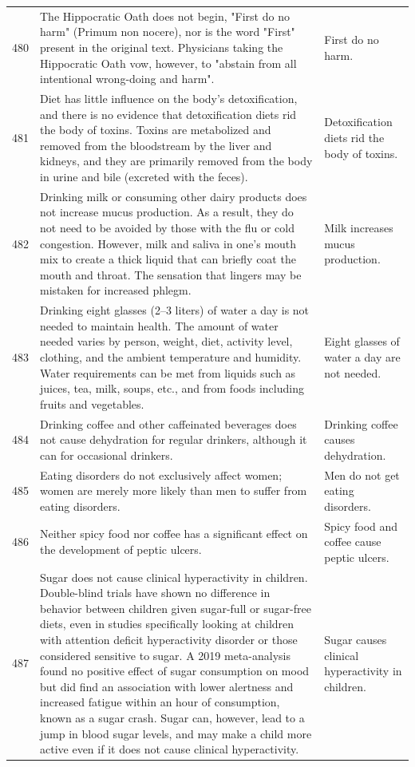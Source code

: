 \begin{tabular}{c|p{}|p{}}
480 & The Hippocratic Oath does not begin, "First do no harm" (Primum non nocere), nor is the word "First" present in the original text. Physicians taking the Hippocratic Oath vow, however, to "abstain from all intentional wrong-doing and harm". & First do no harm. \\
481 & Diet has little influence on the body's detoxification, and there is no evidence that detoxification diets rid the body of toxins. Toxins are metabolized and removed from the bloodstream by the liver and kidneys, and they are primarily removed from the body in urine and bile (excreted with the feces). & Detoxification diets rid the body of toxins. \\
482 & Drinking milk or consuming other dairy products does not increase mucus production. As a result, they do not need to be avoided by those with the flu or cold congestion. However, milk and saliva in one's mouth mix to create a thick liquid that can briefly coat the mouth and throat. The sensation that lingers may be mistaken for increased phlegm. & Milk increases mucus production. \\
483 & Drinking eight glasses (2–3 liters) of water a day is not needed to maintain health. The amount of water needed varies by person, weight, diet, activity level, clothing, and the ambient temperature and humidity. Water requirements can be met from liquids such as juices, tea, milk, soups, etc., and from foods including fruits and vegetables. & Eight glasses of water a day are not needed. \\
484 & Drinking coffee and other caffeinated beverages does not cause dehydration for regular drinkers, although it can for occasional drinkers. & Drinking coffee causes dehydration. \\
485 & Eating disorders do not exclusively affect women; women are merely more likely than men to suffer from eating disorders. & Men do not get eating disorders. \\
486 & Neither spicy food nor coffee has a significant effect on the development of peptic ulcers. & Spicy food and coffee cause peptic ulcers. \\
487 & Sugar does not cause clinical hyperactivity in children. Double-blind trials have shown no difference in behavior between children given sugar-full or sugar-free diets, even in studies specifically looking at children with attention deficit hyperactivity disorder or those considered sensitive to sugar. A 2019 meta-analysis found no positive effect of sugar consumption on mood but did find an association with lower alertness and increased fatigue within an hour of consumption, known as a sugar crash. Sugar can, however, lead to a jump in blood sugar levels, and may make a child more active even if it does not cause clinical hyperactivity. & Sugar causes clinical hyperactivity in children. \\

\end{tabular}
